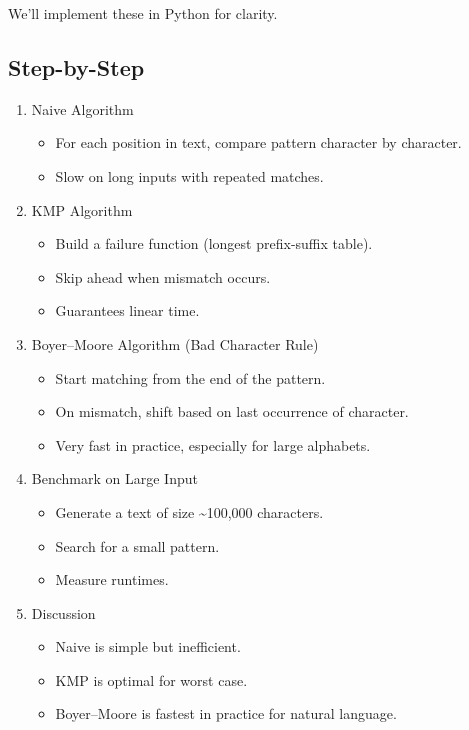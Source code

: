 \documentclass[
  letterpaper,
  DIV=11,
  numbers=noendperiod]{scrreprt}
\providecommand{\tightlist}{%
  \setlength{\itemsep}{0pt}\setlength{\parskip}{0pt}}
\begin{document}
We'll implement these in Python for clarity.

\subsection{Step-by-Step}\label{step-by-step-9}

\begin{enumerate}
\def\labelenumi{\arabic{enumi}.}
\item
  Naive Algorithm

  \begin{itemize}
  \tightlist
  \item
    For each position in text, compare pattern character by character.
  \item
    Slow on long inputs with repeated matches.
  \end{itemize}
\item
  KMP Algorithm

  \begin{itemize}
  \tightlist
  \item
    Build a failure function (longest prefix-suffix table).
  \item
    Skip ahead when mismatch occurs.
  \item
    Guarantees linear time.
  \end{itemize}
\item
  Boyer--Moore Algorithm (Bad Character Rule)

  \begin{itemize}
  \tightlist
  \item
    Start matching from the end of the pattern.
  \item
    On mismatch, shift based on last occurrence of character.
  \item
    Very fast in practice, especially for large alphabets.
  \end{itemize}
\item
  Benchmark on Large Input

  \begin{itemize}
  \tightlist
  \item
    Generate a text of size \textasciitilde100,000 characters.
  \item
    Search for a small pattern.
  \item
    Measure runtimes.
  \end{itemize}
\item
  Discussion

  \begin{itemize}
  \tightlist
  \item
    Naive is simple but inefficient.
  \item
    KMP is optimal for worst case.
  \item
    Boyer--Moore is fastest in practice for natural language.
  \end{itemize}
\end{enumerate}
\end{document}
